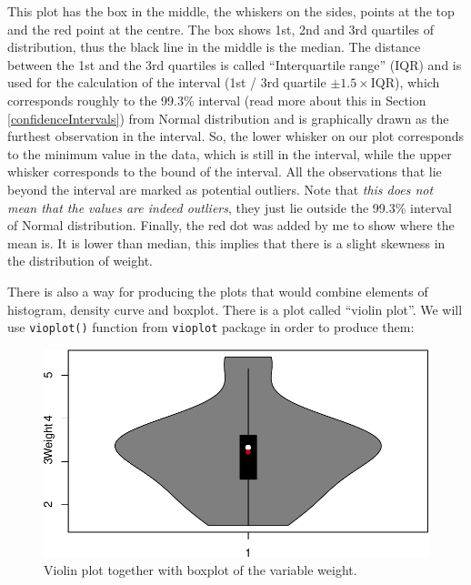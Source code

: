 \documentclass[
]{book}
\newenvironment{Shaded}{\begin{snugshade}}{\end{snugshade}}
\newcommand{\DataTypeTok}[1]{\textcolor[rgb]{0.13,0.29,0.53}{#1}}
\newcommand{\DecValTok}[1]{\textcolor[rgb]{0.00,0.00,0.81}{#1}}
\newcommand{\KeywordTok}[1]{\textcolor[rgb]{0.13,0.29,0.53}{\textbf{#1}}}
\newcommand{\NormalTok}[1]{#1}
\newcommand{\OperatorTok}[1]{\textcolor[rgb]{0.81,0.36,0.00}{\textbf{#1}}}
\newcommand{\StringTok}[1]{\textcolor[rgb]{0.31,0.60,0.02}{#1}}
\theoremstyle{definition}
\theoremstyle{definition}
\theoremstyle{definition}
\theoremstyle{definition}
\theoremstyle{remark}
\begin{document}
This plot has the box in the middle, the whiskers on the sides, points at the top and the red point at the centre. The box shows 1st, 2nd and 3rd quartiles of distribution, thus the black line in the middle is the median. The distance between the 1st and the 3rd quartiles is called ``Interquartile range'' (IQR) and is used for the calculation of the interval (1st / 3rd quartile \(\pm 1.5 \times\)IQR), which corresponds roughly to the 99.3\% interval (read more about this in Section \ref{confidenceIntervals}) from Normal distribution and is graphically drawn as the furthest observation in the interval. So, the lower whisker on our plot corresponds to the minimum value in the data, which is still in the interval, while the upper whisker corresponds to the bound of the interval. All the observations that lie beyond the interval are marked as potential outliers. Note that \emph{this does not mean that the values are indeed outliers}, they just lie outside the 99.3\% interval of Normal distribution. Finally, the red dot was added by me to show where the mean is. It is lower than median, this implies that there is a slight skewness in the distribution of weight.

There is also a way for producing the plots that would combine elements of histogram, density curve and boxplot. There is a plot called ``violin plot''. We will use \texttt{vioplot()} function from \texttt{vioplot} package in order to produce them:

\begin{Shaded}
\end{Shaded}

\begin{figure}
\centering
\includegraphics{Svetunkov---Statistics-for-Business-Analytics_files/figure-latex/vioWeight-1.pdf}
\caption{\label{fig:vioWeight}Violin plot together with boxplot of the variable weight.}
\end{figure}
\end{document}
